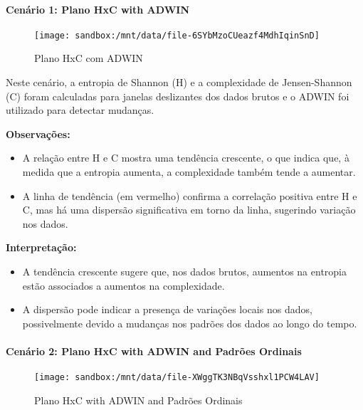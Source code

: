 \documentclass[
]{article}
\begin{document}
\hypertarget{cenuxe1rio-1-plano-hxc-with-adwin}{%
\paragraph{Cenário 1: Plano HxC with
ADWIN}\label{cenuxe1rio-1-plano-hxc-with-adwin}}

\begin{figure}
\centering
\texttt{[image: sandbox:/mnt/data/file-6SYbMzoCUeazf4MdhIqinSnD]}
\caption{Plano HxC com ADWIN}
\end{figure}

Neste cenário, a entropia de Shannon (H) e a complexidade de
Jensen-Shannon (C) foram calculadas para janelas deslizantes dos dados
brutos e o ADWIN foi utilizado para detectar mudanças.

\textbf{Observações:}

\begin{itemize}
\item
  A relação entre H e C mostra uma tendência crescente, o que indica
  que, à medida que a entropia aumenta, a complexidade também tende a
  aumentar.
\item
  A linha de tendência (em vermelho) confirma a correlação positiva
  entre H e C, mas há uma dispersão significativa em torno da linha,
  sugerindo variação nos dados.
\end{itemize}

\textbf{Interpretação:}

\begin{itemize}
\item
  A tendência crescente sugere que, nos dados brutos, aumentos na
  entropia estão associados a aumentos na complexidade.
\item
  A dispersão pode indicar a presença de variações locais nos dados,
  possivelmente devido a mudanças nos padrões dos dados ao longo do
  tempo.
\end{itemize}

\hypertarget{cenuxe1rio-2-plano-hxc-with-adwin-and-padruxf5es-ordinais}{%
\paragraph{Cenário 2: Plano HxC with ADWIN and Padrões
Ordinais}\label{cenuxe1rio-2-plano-hxc-with-adwin-and-padruxf5es-ordinais}}

\begin{figure}
\centering
\texttt{[image: sandbox:/mnt/data/file-XWggTK3NBqVsshxl1PCW4LAV]}
\caption{Plano HxC with ADWIN and Padrões Ordinais}
\end{figure}
\end{document}
